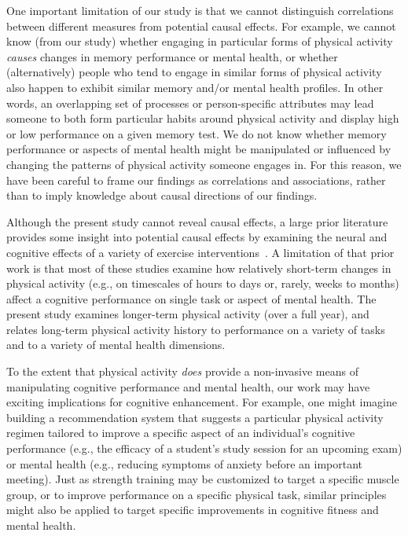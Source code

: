 \documentclass[10pt]{article}
\begin{document}
One important limitation of our study is that we cannot distinguish
correlations between different measures from potential causal
effects.  For example, we cannot know (from our study) whether
engaging in particular forms of physical activity \textit{causes} changes in
memory performance or mental health, or whether (alternatively) people
who tend to engage in similar forms of physical activity also happen to
exhibit similar memory and/or mental health profiles.  In other words,
an overlapping set of processes or person-specific attributes may lead
someone to both form particular habits around physical activity and display high or low performance on a
given memory test.  We do not know whether memory performance or
aspects of mental health might be manipulated or influenced by
changing the patterns of physical activity someone engages in.  For
this reason, we have been careful to frame our findings as
correlations and associations, rather than to imply knowledge about causal directions
of our findings.

Although the present study cannot reveal causal effects, a large prior
literature provides some insight into potential causal effects by examining the neural and cognitive effects of a variety
of exercise interventions~\citep{ChanEtal15, VidoEtal15, KamiEtal07,
  ImboEtal19, SuwaEtal17, SinhEtal21, Tomp03}.  A limitation of that
prior work is that most of these studies examine how relatively
short-term changes in physical activity (e.g., on timescales of hours to days
or, rarely, weeks to months) affect a cognitive performance on single
task or aspect of mental health.  The present study examines
longer-term physical activity (over a full year), and relates long-term
physical activity history to performance on a variety of tasks and to a variety
of mental health dimensions.

To the extent that physical activity \textit{does} provide a non-invasive means
of manipulating cognitive performance and mental health, our work may
have exciting implications for cognitive enhancement.  For example,
one might imagine building a recommendation system that suggests a
particular physical activity regimen tailored to improve a specific aspect of
an individual's cognitive performance (e.g., the efficacy of a student's study session for an
upcoming exam) or mental health (e.g., reducing symptoms of anxiety
before an important meeting).  Just as strength training may be
customized to target a specific muscle group, or to improve
performance on a specific physical task, similar principles might also
be applied to target specific improvements in cognitive fitness
and mental health.
\end{document}
